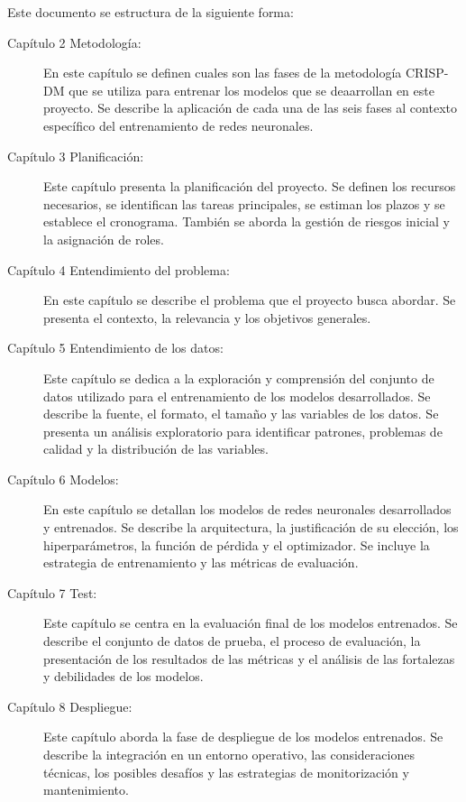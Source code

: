 Este documento se estructura de la siguiente forma:
\begin{description}
\item[Capítulo 2 Metodología:] En este capítulo se definen cuales son las fases de la metodología CRISP-DM que se utiliza para entrenar los modelos que se deaarrollan en este proyecto. Se describe la aplicación de cada una de las seis fases al contexto específico del entrenamiento de redes neuronales.

\item[Capítulo 3 Planificación:] Este capítulo presenta la planificación del proyecto. Se definen los recursos necesarios, se identifican las tareas principales, se estiman los plazos y se establece el cronograma. También se aborda la gestión de riesgos inicial y la asignación de roles.

\item[Capítulo 4 Entendimiento del problema:] En este capítulo se describe el problema que el proyecto busca abordar. Se presenta el contexto, la relevancia y los objetivos generales.

\item[Capítulo 5 Entendimiento de los datos:] Este capítulo se dedica a la exploración y comprensión del conjunto de datos utilizado para el entrenamiento de los modelos desarrollados. Se describe la fuente, el formato, el tamaño y las variables de los datos. Se presenta un análisis exploratorio para identificar patrones, problemas de calidad y la distribución de las variables.

\item[Capítulo 6 Modelos:] En este capítulo se detallan los modelos de redes neuronales desarrollados y entrenados. Se describe la arquitectura, la justificación de su elección, los hiperparámetros, la función de pérdida y el optimizador. Se incluye la estrategia de entrenamiento y las métricas de evaluación.

\item[Capítulo 7 Test:] Este capítulo se centra en la evaluación final de los modelos entrenados. Se describe el conjunto de datos de prueba, el proceso de evaluación, la presentación de los resultados de las métricas y el análisis de las fortalezas y debilidades de los modelos.

\item[Capítulo 8 Despliegue:] Este capítulo aborda la fase de despliegue de los modelos entrenados. Se describe la integración en un entorno operativo, las consideraciones técnicas, los posibles desafíos y las estrategias de monitorización y mantenimiento.


\end{description}
